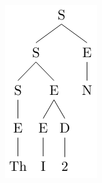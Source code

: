 \begin{minipage}{0.2\linewidth}
    \includegraphics[width=1\linewidth]{images/ableitungsbaum_bsp.png}
\end{minipage}

